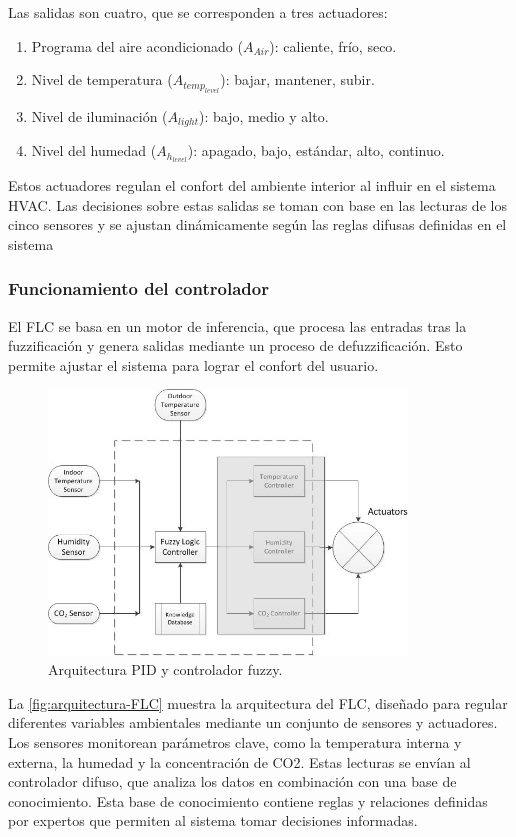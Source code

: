 Las salidas son cuatro, que se corresponden a tres actuadores:
\begin{enumerate}
	\item Programa del aire acondicionado ($A_{Air}$): caliente, frío, seco.
	\item Nivel de temperatura ($A_{temp_{level}}$): bajar, mantener, subir.
	\item Nivel de iluminación ($A_{light}$): bajo, medio y alto.
	\item Nivel del humedad ($A_{h_{level}}$): apagado, bajo, estándar, alto, continuo.
\end{enumerate}

Estos actuadores regulan el confort del ambiente interior al influir en el sistema HVAC. Las decisiones sobre estas salidas se toman con base en las lecturas de los cinco sensores y se ajustan dinámicamente según las reglas difusas definidas en el sistema

\subsubsection{Funcionamiento del controlador}

El FLC se basa en un motor de inferencia, que procesa las entradas tras la fuzzificación y genera salidas mediante un proceso de defuzzificación. Esto permite ajustar el sistema para lograr el confort del usuario.

\begin{figure}[H]
	\centering
	\includegraphics[width=0.85\textwidth]{imgs/arquitectura-FLC.JPG}
	\caption{Arquitectura PID y controlador fuzzy.}
	\label{fig:arquitectura-FLC}
\end{figure}

La \autoref{fig:arquitectura-FLC} muestra la arquitectura del FLC, diseñado para regular diferentes variables ambientales mediante un conjunto de sensores y actuadores. Los sensores monitorean parámetros clave, como la temperatura interna y externa, la humedad y la concentración de CO2. Estas lecturas se envían al controlador difuso, que analiza los datos en combinación con una base de conocimiento. Esta base de conocimiento contiene reglas y relaciones definidas por expertos que permiten al sistema tomar decisiones informadas.

